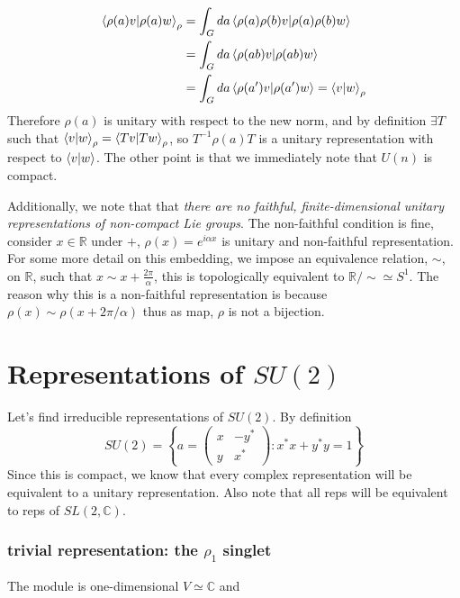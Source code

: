 \begin{enumerate}
\begin{equation}
    \begin{split}
        \braket{\rho(a)v|\rho(a)w}_{\rho} &= \int_{G} da\braket{\rho(a)\rho(b)v|\rho(a)\rho(b)w}\\
        &=\int_{G} da\braket{\rho(ab)v|\rho(ab)w}\\
        &=\int_{G} da\braket{\rho(a')v|\rho(a')w}=\braket{v|w}_{\rho}
    \end{split}
\end{equation}
Therefore $\rho(a)$ is unitary with respect to the new norm, and by definition $\exists T$ such that $\braket{v|w}_{\rho} = \braket{Tv|Tw}_{\rho}$, so $T^{-1}\rho(a)T$ is a unitary representation with respect to $\braket{v|w}$. The other point is that we immediately note that $U(n)$ is compact. 

Additionally, we note that that \textit{there are no faithful, finite-dimensional unitary representations of non-compact Lie groups}. The non-faithful condition is fine, consider $x\in\mathbb{R}$ under $+$, $\rho(x) = e^{i\alpha x}$ is unitary and non-faithful representation. For some more detail on this embedding, we impose an equivalence relation, $\sim{}$, on $\mathbb{R}$, such that $x\sim{} x + \frac{2\pi}{\alpha}$, this is topologically equivalent to $\mathbb{R}/\sim{} \simeq S^1$. The reason why this is a non-faithful representation is because $\rho(x)\sim{}\rho(x + 2\pi/\alpha)$ thus as map, $\rho$ is not a bijection. 

\section{Representations of $SU(2)$}
Let's find irreducible representations of $SU(2)$. By definition
\begin{equation}
    SU(2) = \left\{a = \begin{pmatrix}
        x & -y^*\\
        y & x^*
    \end{pmatrix}: x^*x + y^*y = 1 \right\}
\end{equation}
Since this is compact, we know that every complex representation will be equivalent to a unitary representation. Also note that all reps will be equivalent to reps of $SL(2, \mathbb{C})$. 
\subsubsection{trivial representation: the $\rho_1$ singlet}
The module is one-dimensional $V\simeq \mathbb{C}$ and 


\end{enumerate}
